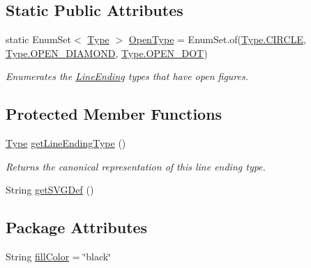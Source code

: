 \subsection*{Static Public Attributes}
\begin{DoxyCompactItemize}
\item 
static Enum\+Set$<$ \hyperlink{enumcom_1_1aarrelaakso_1_1drawl_1_1_line_ending_1_1_type}{Type} $>$ \hyperlink{classcom_1_1aarrelaakso_1_1drawl_1_1_line_ending_a79fa3953c05f8a1dfe1669fdda242ce2}{Open\+Type} = Enum\+Set.\+of(\hyperlink{enumcom_1_1aarrelaakso_1_1drawl_1_1_line_ending_1_1_type_af07aa0aa4f1de58f3eb19da4f8fc4ba2}{Type.\+C\+I\+R\+C\+LE}, \hyperlink{enumcom_1_1aarrelaakso_1_1drawl_1_1_line_ending_1_1_type_a13f6d6fbec0c37e1b87096ceb067ee6b}{Type.\+O\+P\+E\+N\+\_\+\+D\+I\+A\+M\+O\+ND}, \hyperlink{enumcom_1_1aarrelaakso_1_1drawl_1_1_line_ending_1_1_type_a4c9d73e9e0f20637712c6a8183742eee}{Type.\+O\+P\+E\+N\+\_\+\+D\+OT})
\begin{DoxyCompactList}\small\item\em Enumerates the \hyperlink{classcom_1_1aarrelaakso_1_1drawl_1_1_line_ending}{Line\+Ending} types that have open figures. \end{DoxyCompactList}\end{DoxyCompactItemize}
\subsection*{Protected Member Functions}
\begin{DoxyCompactItemize}
\item 
\hyperlink{enumcom_1_1aarrelaakso_1_1drawl_1_1_line_ending_1_1_type}{Type} \hyperlink{classcom_1_1aarrelaakso_1_1drawl_1_1_line_ending_a37d765d892d173660eef0f321781f455}{get\+Line\+Ending\+Type} ()
\begin{DoxyCompactList}\small\item\em Returns the canonical representation of this line ending type. \end{DoxyCompactList}\item 
String \hyperlink{classcom_1_1aarrelaakso_1_1drawl_1_1_line_ending_a30fe25c0bc92fe34abffcd1b16248605}{get\+S\+V\+G\+Def} ()
\end{DoxyCompactItemize}
\subsection*{Package Attributes}
\begin{DoxyCompactItemize}
\item 
String \hyperlink{classcom_1_1aarrelaakso_1_1drawl_1_1_line_ending_a82865a5ebb3ae1ea53bb9dcfe35758b1}{fill\+Color} = \char`\"{}black\char`\"{}
\end{DoxyCompactItemize}
